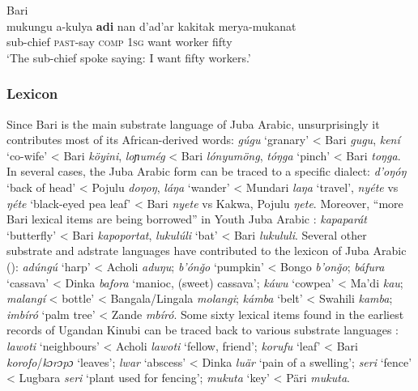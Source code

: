 \documentclass[output=paper]{langsci/langscibook}
\begin{document}
\ea\label{ex:key:}

{Bari \citep[469]{Miller2001}}\\
\gll    mukungu a-kulya \textbf{adi} nan d'ad'ar kakitak merya-mukanat\\
                sub-chief \textsc{past}-say \textsc{comp} 1\textsc{sg} want worker fifty\\
\glt     `The sub-chief spoke saying: I want fifty workers.'
\z


 \subsubsection{Lexicon}

Since Bari is the main substrate language of Juba Arabic, unsurprisingly it contributes most of its African-derived words: \textit{gúgu} ‘granary’ < Bari \textit{gugu}, \textit{kení} ‘co-wife’ < Bari \textit{köyini}, \textit{loɲumé}\textit{g} < Bari \textit{lónyumöng}, \textit{tóŋga} ‘pinch’ < Bari \textit{toŋga}. In several cases, the Juba Arabic form can be traced to a specific dialect: \textit{d'oŋóŋ} ‘back of head’ < Pojulu \textit{doŋoŋ}, \textit{láŋa} ‘wander’ < Mundari \textit{laŋa} ‘travel’, \textit{nyéte} vs \textit{ŋéte} ‘black-eyed pea leaf’ < Bari \textit{nyete} vs Kakwa, Pojulu \textit{ŋete}. Moreover, “more Bari lexical items are being borrowed” in Youth Juba Arabic \citep[131]{Nakao2012}: \textit{kapaparát} ‘butterfly’ < Bari \textit{kapoportat}, \textit{lukulúli} ‘bat’ < Bari \textit{lukululi}. Several other substrate and adstrate languages have contributed to the lexicon of Juba Arabic (\citealt{Nakao2012,Nakao2015}): \textit{adúngú} ‘harp’ < Acholi \textit{aduŋu}; \textit{b'ónǧ}\textit{o} ‘pumpkin’ < Bongo \textit{b'onǧo}; \textit{báfura} ‘cassava’ < Dinka \textit{bafora} ‘manioc, (sweet) cassava’; \textit{káwu} ‘cowpea’ < Ma'di \textit{kau}; \textit{malangí} < bottle’ < Bangala/Lingala \textit{molangi}; \textit{kámba} ‘belt’ < Swahili \textit{kamba}; \textit{imbíró} ‘palm tree’ < Zande \textit{mbíró}. Some sixty lexical items found in the earliest records of Ugandan Kinubi can be traced back to various substrate languages \citep{Avram2017talk}: \textit{lawoti} ‘neighbours’ < Acholi \textit{lawoti} ‘fellow, friend’; \textit{korufu} ‘leaf’ < Bari \textit{korofo}/\textit{kɔrɔ}\textit{pɔ} ‘leaves’; \textit{lwar} ‘abscess’ < Dinka \textit{luär} ‘pain of a swelling’; \textit{seri} ‘fence’ < Lugbara \textit{seri} ‘plant used for fencing’; \textit{mukuta} ‘key’ < Päri \textit{mukuta}.
\end{document}
